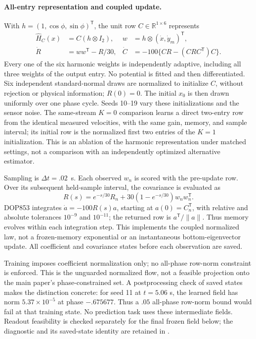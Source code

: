 \documentclass[journal]{IEEEtran}
\begin{document}
\paragraph{All-entry representation and coupled update.}
With $h=(1,\cos\phi,\sin\phi)^{\mathsf T}$, the unit row
$C\in\mathbb R^{1\times6}$ represents
\begin{align}
 \widehat H_C(x)&=C(h\otimes I_2),&
 w&=h\otimes(\dot x,\dot y_m)^{\mathsf T},\label{eq:df_lift}\\
 \dot R&=ww^{\mathsf T}-R/30,&
 \dot C&=-100\{CR-(CRC^{\mathsf T})C\}.
 \label{eq:df_update}
\end{align}
Every one of the six harmonic weights is independently adaptive, including
all three weights of the output entry. No potential is fitted and then
differentiated. Six independent standard-normal draws are normalized to
initialize $C$, without rejection or physical information; $R(0)=0$.
The initial $x_0$ is then drawn uniformly over one phase cycle. Seeds 10--19
vary these initializations and the sensor noise. The same-stream $K=0$
comparison learns a direct two-entry row from the identical measured
velocities, with the same gain, memory, and sample interval; its initial row
is the normalized first two entries of the $K=1$ initialization. This is an
ablation of the harmonic representation under matched settings, not a
comparison with an independently optimized alternative estimator.

Sampling is $\Delta t=.02$~s. Each observed $w_n$ is scored with the pre-update
row. Over its subsequent held-sample interval, the covariance is evaluated as
\begin{equation}
 R(s)=e^{-s/30}R_n+30(1-e^{-s/30})w_nw_n^{\mathsf T}.
 \label{eq:df_memory}
\end{equation}
DOP853 integrates $\dot a=-100R(s)a$, starting at $a(0)=C_n^{\mathsf T}$,
with relative and absolute tolerances $10^{-9}$ and $10^{-11}$; the returned
row is $a^{\mathsf T}/\|a\|$. Thus memory evolves within each integration
step. This implements the coupled normalized law, not a frozen-memory
exponential or an instantaneous bottom-eigenvector update. All coefficient
and covariance states before each observation are saved.

Training imposes coefficient normalization only; no all-phase row-norm
constraint is enforced. This is the unguarded normalized flow, not a feasible
projection onto the main paper's phase-constrained set. A postprocessing check
of saved states makes the distinction concrete: for seed 11 at $t=5.06$ s,
the learned field has norm $5.37\times10^{-5}$ at phase $-.675677$.
Thus a $.05$ all-phase row-norm bound would fail at that training state.
No prediction task uses these intermediate fields. Readout feasibility is
checked separately for the final frozen field below; the diagnostic and its
saved-state identity are retained in .
\end{document}
